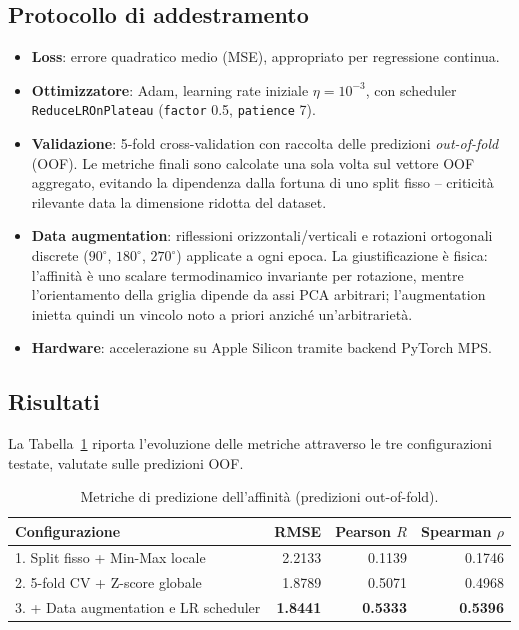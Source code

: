 \documentclass[11pt,a4paper]{article}
\begin{document}
\subsection{Protocollo di addestramento}
\begin{itemize}
    \item \textbf{Loss}: errore quadratico medio (MSE), appropriato per regressione continua.
    \item \textbf{Ottimizzatore}: Adam, learning rate iniziale $\eta = 10^{-3}$, con scheduler \texttt{ReduceLROnPlateau} (\texttt{factor} 0.5, \texttt{patience} 7).
    \item \textbf{Validazione}: 5-fold cross-validation con raccolta delle predizioni \emph{out-of-fold} (OOF). Le metriche finali sono calcolate una sola volta sul vettore OOF aggregato, evitando la dipendenza dalla fortuna di uno split fisso -- criticità rilevante data la dimensione ridotta del dataset.
    \item \textbf{Data augmentation}: riflessioni orizzontali/verticali e rotazioni ortogonali discrete ($90^\circ$, $180^\circ$, $270^\circ$) applicate a ogni epoca. La giustificazione è fisica: l'affinità è uno scalare termodinamico invariante per rotazione, mentre l'orientamento della griglia dipende da assi PCA arbitrari; l'augmentation inietta quindi un vincolo noto a priori anziché un'arbitrarietà.
    \item \textbf{Hardware}: accelerazione su Apple Silicon tramite backend PyTorch MPS.
\end{itemize}

\subsection{Risultati}
La Tabella~\ref{tab:cnn} riporta l'evoluzione delle metriche attraverso le tre configurazioni testate, valutate sulle predizioni OOF.

\begin{table}[h]
\centering
\caption{Metriche di predizione dell'affinità (predizioni out-of-fold).}
\label{tab:cnn}
\begin{tabular}{lrrr}
\toprule
Configurazione & RMSE & Pearson $R$ & Spearman $\rho$ \\
\midrule
1. Split fisso + Min-Max locale & 2.2133 & 0.1139 & 0.1746 \\
2. 5-fold CV + Z-score globale & 1.8789 & 0.5071 & 0.4968 \\
3. + Data augmentation e LR scheduler & \textbf{1.8441} & \textbf{0.5333} & \textbf{0.5396} \\
\bottomrule
\end{tabular}
\end{table}
\end{document}
